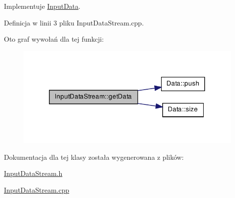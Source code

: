 \-Implementuje \hyperlink{class_input_data_ae1d8f8a2a2a7f7d4c4d3595ed767ef3d}{\-Input\-Data}.



\-Definicja w linii 3 pliku \-Input\-Data\-Stream.\-cpp.



\-Oto graf wywołań dla tej funkcji\-:\nopagebreak
\begin{figure}[H]
\begin{center}
\leavevmode
\includegraphics[width=320pt]{class_input_data_stream_aa25420a7aa42ed58124728ba30df0f71_cgraph}
\end{center}
\end{figure}




\-Dokumentacja dla tej klasy została wygenerowana z plików\-:\begin{DoxyCompactItemize}
\item 
\hyperlink{_input_data_stream_8h}{\-Input\-Data\-Stream.\-h}\item 
\hyperlink{_input_data_stream_8cpp}{\-Input\-Data\-Stream.\-cpp}\end{DoxyCompactItemize}
